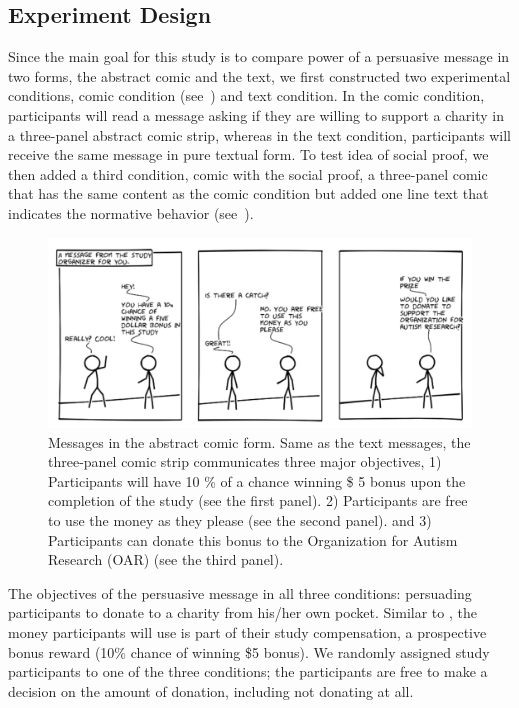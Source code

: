 \subsection{Experiment Design}
Since the main goal for this study is to compare power of a persuasive message in two forms, the abstract comic and the text, we first constructed two experimental conditions, comic condition (see~) and text condition. In the comic condition, participants will read a message asking if they are willing to support a charity in a three-panel abstract comic strip, whereas in the text condition, participants will receive the same message in pure textual form. To test idea of social proof, we then added a third condition, comic with the social proof, a three-panel comic that has the same content as the comic condition but added one line text that indicates the normative behavior (see~).

\begin{figure}[bt]
	\centering
	\includegraphics[width=\columnwidth]{./figures/abstract_comic.png}
	\caption{Messages in the abstract comic form. Same as the text messages, the three-panel comic strip communicates three major objectives, 1) Participants will have 10 \% of a chance winning \$ 5 bonus upon the completion of the study (see the first panel). 2) Participants are free to use the money as they please (see the second panel). and 3) Participants can donate this bonus to the Organization for Autism Research (OAR) (see the third panel).}
	\label{fig:basic three comic panel}
\end{figure}

The objectives of the persuasive message in all three conditions: persuading participants to donate to a charity from his/her own pocket. Similar to \textcite{lee2013does}, the money participants will use is part of their study compensation, a prospective bonus reward (10\% chance of winning \$5 bonus). We randomly assigned study participants to one of the three conditions; the participants are free to make a decision on the amount of donation, including not donating at all.

